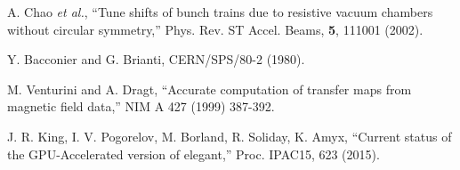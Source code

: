 \documentclass[11pt]{article}
\begin{document}
\begin{thebibliography}{9}
  A. Chao {\em et al.}, ``Tune shifts of bunch trains due to resistive vacuum chambers without circular symmetry,''
  Phys. Rev. ST Accel. Beams, {\bf 5}, 111001 (2002).

Y. Bacconier and G. Brianti, CERN/SPS/80-2 (1980).

M. Venturini and A. Dragt, ``Accurate computation of transfer maps from magnetic field data,'' 
NIM A 427 (1999) 387-392.

J. R. King, I. V. Pogorelov, M. Borland, R. Soliday, K. Amyx,
``Current status of the GPU-Accelerated version of elegant,''
Proc. IPAC15, 623 (2015).

\end{thebibliography}
\end{document}
